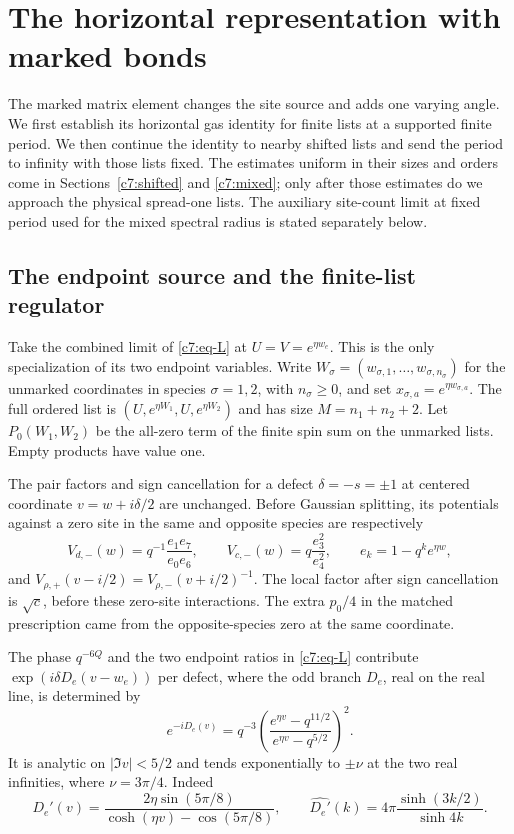 \section{The horizontal representation with marked bonds}\label{c7:markedgas}

The marked matrix element changes the site source and adds one
varying angle. We first establish its horizontal gas identity for
finite lists at a supported finite period. We then continue the
identity to nearby shifted lists and send the period to infinity
with those lists fixed. The estimates uniform in their sizes and
orders come in Sections~\ref{c7:shifted} and \ref{c7:mixed}; only
after those estimates do we approach the physical spread-one
lists. The auxiliary site-count limit at fixed period used for the
mixed spectral radius is stated separately below.

\subsection{The endpoint source and the finite-list regulator}

Take the combined limit of \eqref{c7:eq-L} at
$U=V=e^{\eta w_e}$. This is the only specialization of its two
endpoint variables. Write
$W_\sigma=(w_{\sigma,1},\ldots,w_{\sigma,n_\sigma})$ for the
unmarked coordinates in species $\sigma=1,2$, with
$n_\sigma\ge0$, and set $x_{\sigma,a}=e^{\eta w_{\sigma,a}}$.
The full ordered list is $(U,e^{\eta W_1},U,e^{\eta W_2})$ and
has size $M=n_1+n_2+2$. Let $P_0(W_1,W_2)$ be the all-zero term
of the finite spin sum on the unmarked lists. Empty products have
value one.

The pair factors and sign cancellation for a defect
$\delta=-s=\pm1$ at centered coordinate $v=w+i\delta/2$ are
unchanged. Before Gaussian splitting, its potentials against a
zero site in the same and opposite species are respectively
\[
 V_{d,-}(w)=q^{-1}\frac{e_1e_7}{e_0e_6},\qquad
 V_{c,-}(w)=q\frac{e_3^2}{e_4^2},\qquad
 e_k=1-q^ke^{\eta w},
\]
and $V_{\rho,+}(v-i/2)=V_{\rho,-}(v+i/2)^{-1}$.
The local factor after sign cancellation is $\sqrt c$, before
these zero-site interactions. The extra $p_0/4$ in the matched
prescription came from the opposite-species zero at the same
coordinate.

The phase $q^{-6Q}$ and the two endpoint ratios in
\eqref{c7:eq-L} contribute $\exp(i\delta D_e(v-w_e))$ per defect,
where the odd branch $D_e$, real on the real line, is determined by
\[
 e^{-iD_e(v)}
 =q^{-3}\left(\frac{e^{\eta v}-q^{11/2}}
                    {e^{\eta v}-q^{5/2}}\right)^2.
\]
It is analytic on $|\Im v|<5/2$ and tends exponentially to
$\pm\nu$ at the two real infinities, where $\nu=3\pi/4$.
Indeed
\[
 D_e'(v)=\frac{2\eta\sin(5\pi/8)}
                  {\cosh(\eta v)-\cos(5\pi/8)},\qquad
 \widehat{D_e'}(k)=4\pi\frac{\sinh(3k/2)}{\sinh4k}.
\]

